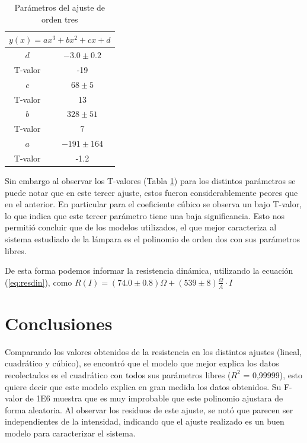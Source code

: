 \documentclass[twoside,twocolumn,a4paper]{article}
\begin{document}
\begin{table}
\centering
\caption{Par\'ametros del ajuste de orden tres}
\label{tab:o3}
\begin{tabular}{|c|c|}
\hline
\multicolumn{2}{|c|}{$y(x)=ax^3+bx^2+cx+d$} \\ \hline
$d$                  & $-3.0\pm0.2$           \\ \hline
T-valor            & -19                    \\ \hline
$c$                  & $68\pm5$               \\ \hline
T-valor            & 13                     \\ \hline
$b$                  & $328\pm51$             \\ \hline
T-valor            & 7                      \\ \hline
$a$                  & $-191\pm164$           \\ \hline
T-valor            & -1.2                   \\ \hline
\end{tabular}
\end{table}


Sin embargo al observar los T-valores (Tabla \ref{tab:o3}) para los distintos par\'ametros se puede notar que en este tercer ajuste, estos fueron considerablemente peores que en el anterior. En particular para el coeficiente c\'ubico se observa un bajo T-valor, lo que indica que este tercer par\'ametro tiene una baja significancia. Esto nos permiti\'o concluir que de los modelos utilizados, el que mejor caracteriza al sistema estudiado de la l\'ampara es el polinomio de orden dos con sus par\'ametros libres.\par

De esta forma podemos informar la resistencia din\'amica, utilizando la ecuaci\'on (\ref{eq:resdin}), como $R(I) = (74.0\pm0.8) \Omega +(539\pm8) \frac{\Omega}{A}\cdot I$


\section{Conclusiones}

Comparando los valores obtenidos de la resistencia en los distintos ajustes (lineal, cuadr\'atico y c\'ubico), se encontr\'o que el modelo que mejor explica los datos recolectados es el cuadr\'atico con todos sus par\'ametros libres ($R^2$ = 0,99999), esto quiere decir que este modelo explica en gran medida los datos obtenidos. Su F-valor de 1E6 muestra que es muy improbable que este polinomio ajustara de forma aleatoria. Al observar los residuos de este ajuste, se not\'o que parecen ser independientes de la intensidad, indicando que el ajuste realizado es un buen modelo para caracterizar el sistema.
\par
\end{document}
